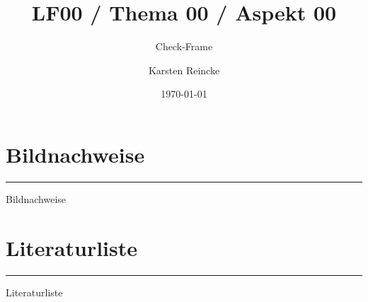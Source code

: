 \documentclass[]{beamer}
\title{LF00 / Thema 00 / Aspekt 00}
\subtitle{Check-Frame}
\institute{GS-LDK}
\author{Karsten Reincke}
\date{\today}
\begin{document}
\nocite{*}

\begin{frame}
  \titlepage
\end{frame}



\logo{}
\newpage
\section{Bildnachweise}
\noindent\rule{\linewidth}{0.4pt}

\begin{small}Bildnachweise\end{small}

\vspace{0.22cm}
\begin{tiny}
 
\end{tiny}

\newpage
\section{Literaturliste}
\noindent\rule{\linewidth}{0.4pt}

\begin{small}Literaturliste\end{small}

\vspace{0.22cm}
\printbibliography
\end{document}
